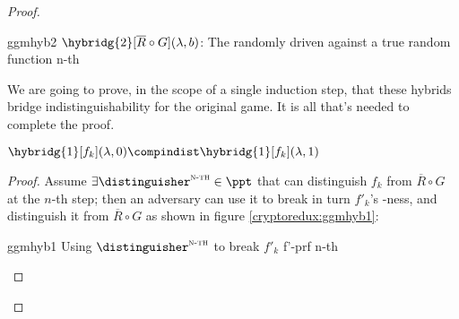 \begin{proof}
\begin{cryptogame}

    \end{cryptogame}

    \begin{cryptogame}
        {ggmhyb2}
        {$\hybridg{2}[\overline{R} \circ G](\lambda, b)$: The randomly driven \prg{} against a true random function}
        {n-th}


        \cseqdelay
        \cseqbeginloop
        \cseqendloop
        \cseqdelay


    \end{cryptogame}
    
    We are going to prove, in the scope of a single induction step, that these hybrids bridge indistinguishability for the original game. It is all that's needed to complete the proof.

    \begin{lemma}
        $\hybridg{1}[f_k](\lambda, 0) \compindist \hybridg{1}[f_k](\lambda, 1)$       
    \end{lemma}

    \begin{proof}
        Assume $\exists \distinguisher^{\textsc{n-th}} \in \ppt$ that can distinguish $f_k$ from $\overline{R} \circ G$ at the $n$-th step; then an adversary \adversary{} can use it to break in turn $f'_k$'s \prf-ness, and distinguish it from $\overline{R} \circ G$ as shown in figure \ref{cryptoredux:ggmhyb1}:

        \begin{cryptoredux}
            {ggmhyb1}
            {Using $\distinguisher^{\textsc{n-th}}$ to break $f'_k$}
            {f'-prf}
            {n-th}


\end{cryptoredux}
\end{proof}
\end{proof}
